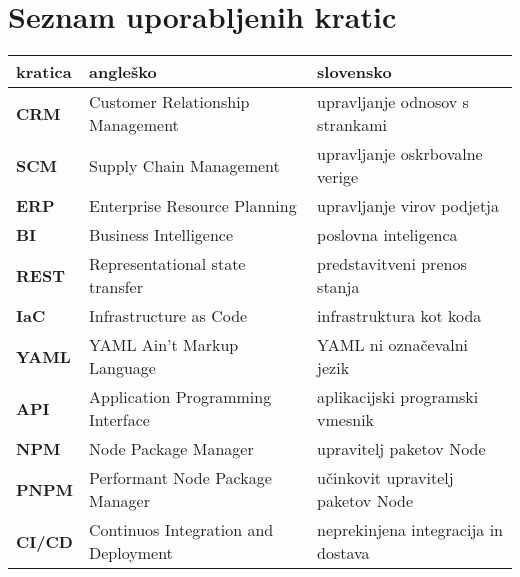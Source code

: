 \chapter*{Seznam uporabljenih kratic}

\begin{tabular}{l|l|l}
  {\bf kratica} & {\bf angleško} & {\bf slovensko} \\ \hline
  {\bf CRM} & Customer Relationship Management & upravljanje odnosov s strankami \\
  {\bf SCM} & Supply Chain Management & upravljanje oskrbovalne verige \\
  {\bf ERP} & Enterprise Resource Planning & upravljanje virov podjetja \\
  {\bf BI} & Business Intelligence & poslovna inteligenca \\
  {\bf REST} & Representational state transfer & predstavitveni prenos stanja \\
  {\bf IaC} & Infrastructure as Code & infrastruktura kot koda \\
  {\bf YAML} & YAML Ain't Markup Language & YAML ni označevalni jezik \\
  {\bf API} & Application Programming Interface & aplikacijski programski vmesnik \\
  {\bf NPM} & Node Package Manager & upravitelj paketov Node \\
  {\bf PNPM} & Performant Node Package Manager & učinkovit upravitelj paketov Node \\
  {\bf CI/CD} & Continuos Integration and Deployment & neprekinjena integracija in dostava \\
  
\end{tabular}